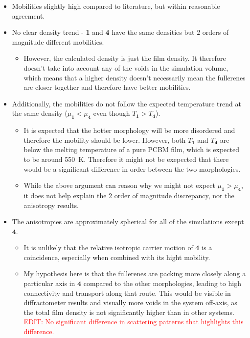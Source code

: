 \documentclass[12pt]{article}
\begin{document}
\begin{itemize}
    \item{Mobilities slightly high compared to literature, but within reasonable agreement.}
    \item{No clear density trend - \textbf{1} and \textbf{4} have the same densities but 2 orders of magnitude different mobilities.
        \begin{itemize}
            \item{However, the calculated density is just the film density. 
        It therefore doesn't take into account any of the voids in the simulation volume, which means that a higher density doesn't necessarily mean the fullerenes are closer together and therefore have better mobilities.}
        \end{itemize}}
    \item{Additionally, the mobilities do not follow the expected temperature trend at the same density ($\mu_{\textbf{1}} < \mu_{\textbf{4}}$ even though $T_{\textbf{1}} > T_{\textbf{4}}$).}
        \begin{itemize}
            \item{It is expected that the hotter morphology will be more disordered and therefore the mobility should be lower.
                    However, both $T_{\textbf{1}}$ and $T_{\textbf{4}}$ are below the melting temperature of a pure PCBM film, which is expected to be around \SI{550}{\kelvin}\cite{Ngo2012a}.
                Therefore it might not be exepected that there would be a significant difference in order between the two morphologies.}
            \item{While the above argument can reason why we might not expect $\mu_{\textbf{1}} > \mu_{\textbf{4}}$, it does not help explain the 2 order of magnitude discrepancy, nor the anisotropy results.}
        \end{itemize}
    \item{The anisotropies are approximately spherical for all of the simulations except $\textbf{4}$.
            \begin{itemize}
                \item{It is unlikely that the relative isotropic carrier motion of $\textbf{4}$ is a coincidence, especially when combined with its hight mobility.}
                \item{My hypothesis here is that the fullerenes are packing more closely along a particular axis in $\textbf{4}$ compared to the other morphologies, leading to high connectivity and transport along that route.
                    This would be visible in diffractometer results and visually more voids in the system off-axis, as the total film density is not significantly higher than in other systems.
                \textcolor{red}{EDIT: No significant difference in scattering patterns that highlights this difference.}}
            \end{itemize}}
\end{itemize}
\end{document}
